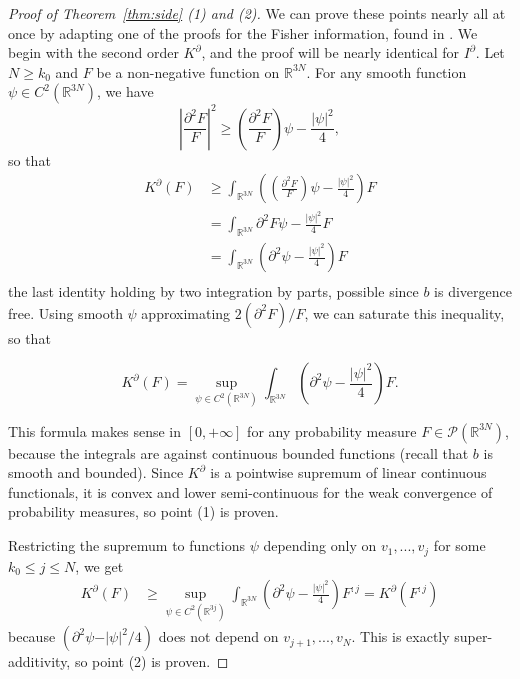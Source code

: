 \documentclass[11pt,a4paper]{article}
\theoremstyle{definition}
\theoremstyle{plain}
\begin{document}
\begin{proof}[Proof of Theorem~\ref{thm:side} (1) and (2)]
We can prove these points nearly all at once by adapting one of the proofs for the Fisher information, found in \cite[Lemmas 3.5 and 3.7]{HaurayMischler2012}. We begin with the second order $K^\partial$, and the proof will be nearly identical for $I^\partial$. Let $N\geq k_0$ and $F$ be a non-negative function on $\mathbb{R}^{3N}$.
For any smooth function $\psi \in C^2(\mathbb{R}^{3N})$, we have
    $$\left\vert \frac{\partial^2 F}{F} \right\vert^2 \geq \left( \frac{\partial^2 F}{F} \right) \psi -\frac{\vert \psi\vert^2}{4},$$
    so that
    \begin{align*}
       K^\partial(F) &\geq \int_{\mathbb{R}^{3N}}\left(\left( \frac{\partial^2 F}{F} \right) \psi -\frac{\vert \psi\vert^2}{4}\right)F\\
        &=\int_{\mathbb{R}^{3N}}\partial^2 F  \psi -\frac{\vert \psi\vert^2}{4}F\\
        &=\int_{\mathbb{R}^{3N}}   \left(\partial^2\psi -\frac{\vert \psi\vert^2}{4}\right)F\\
    \end{align*}
    the last identity holding by two integration by parts, possible since $b$ is divergence free.
    Using smooth $\psi$ approximating $2(\partial^2 F)/F$, we can saturate this inequality, so that
    
    $$K^\partial(F) = \sup_{\psi \in C^2(\mathbb{R}^{3N})}\int_{\mathbb{R}^{3N}}   \left(\partial^2\psi -\frac{\vert \psi\vert^2}{4}\right)F.$$
    
    This formula makes sense in $[0,+\infty]$ for any probability measure $F\in \mathcal{P}(\mathbb{R}^{3N})$, because the integrals are against continuous bounded functions (recall that $b$ is smooth and bounded). Since $K^\partial$ is a pointwise supremum of linear continuous functionals, it is convex and lower semi-continuous for the weak convergence of probability measures, so point (1) is proven.
    
    Restricting the supremum to functions $\psi$ depending only on $v_1,...,v_j$ for some $k_0\leq j\leq N$, we get
    \begin{align*}
        K^\partial(F) &\geq \sup_{\psi \in C^2(\mathbb{R}^{3j})} \int_{\mathbb{R}^{3N}}   \left(\partial^2\psi -\frac{\vert \psi\vert^2}{4}\right)F^{:j}=K^\partial(F^{:j})
    \end{align*}
    because $(\partial^2\psi -\vert \psi\vert^2/4)$ does not depend on $v_{j+1},...,v_{N}$. This is exactly super-additivity, so point (2) is proven.


\end{proof}
\end{document}
